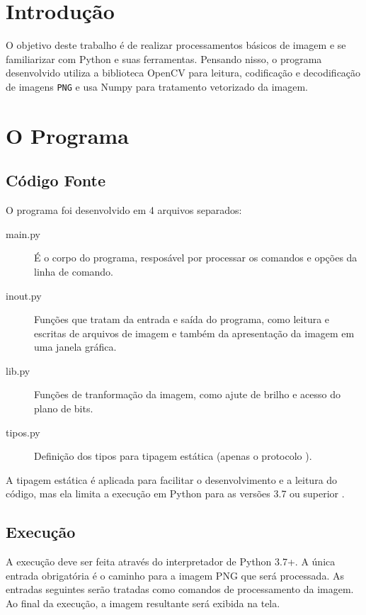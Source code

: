 \documentclass[assignment = 0]{homework}
\begin{document}
    \section{Introdução}

    O objetivo deste trabalho é de realizar processamentos básicos de imagem e se familiarizar com Python e suas ferramentas. Pensando nisso, o programa desenvolvido utiliza a biblioteca OpenCV para leitura, codificação e decodificação de imagens \texttt{PNG} e usa Numpy para tratamento vetorizado da imagem.

    \section{O Programa}

    \subsection{Código Fonte}

    O programa foi desenvolvido em 4 arquivos separados:

    \begin{description}
        \item[main.py] É o corpo do programa, resposável por processar os comandos e opções da linha de comando.

        \item[inout.py] Funções que tratam da entrada e saída do programa, como leitura e escritas de arquivos de imagem e também da apresentação da imagem em uma janela gráfica.

        \item[lib.py] Funções de tranformação da imagem, como ajute de brilho e acesso do plano de bits.

        \item[tipos.py] Definição dos tipos para tipagem estática (apenas o protocolo \autocite{ref:pep544} ).
    \end{description}

    A tipagem estática é aplicada para facilitar o desenvolvimento e a leitura do código, mas ela limita a execução em Python para as versões 3.7 ou superior \autocite{ref:pep563}.

    \subsection{Execução}

    A execução deve ser feita através do interpretador de Python 3.7+. A única entrada obrigatória é o caminho para a imagem PNG que será processada. As entradas seguintes serão tratadas como comandos de processamento da imagem. Ao final da execução, a imagem resultante será exibida na tela.
\end{document}
